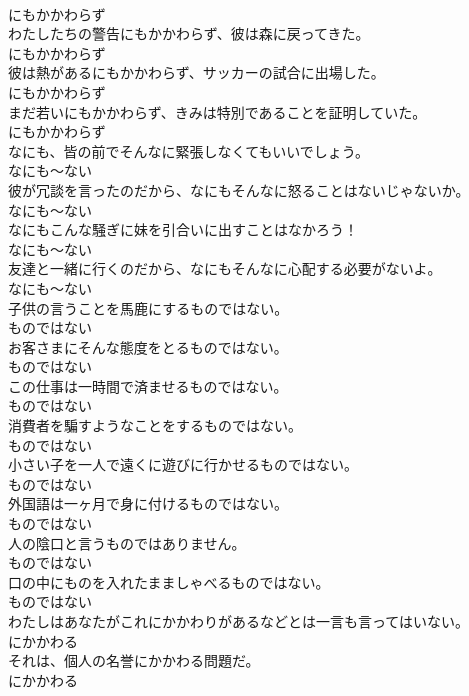\documentclass[8pt]{extreport}
\begin{document}
\begin{CJK}{UTF8}{min}
\\	にもかかわらず	
\\	わたしたちの警告にもかかわらず、彼は森に戻ってきた。	
\\	にもかかわらず	
\\	彼は熱があるにもかかわらず、サッカーの試合に出場した。	
\\	にもかかわらず	
\\	まだ若いにもかかわらず、きみは特別であることを証明していた。	
\\	にもかかわらず	
\\	なにも、皆の前でそんなに緊張しなくてもいいでしょう。	
\\	なにも～ない	
\\	彼が冗談を言ったのだから、なにもそんなに怒ることはないじゃないか。	
\\	なにも～ない	
\\	なにもこんな騒ぎに妹を引合いに出すことはなかろう！	
\\	なにも～ない	
\\	友達と一緒に行くのだから、なにもそんなに心配する必要がないよ。	
\\	なにも～ない	
\\	子供の言うことを馬鹿にするものではない。	
\\	ものではない	
\\	お客さまにそんな態度をとるものではない。	
\\	ものではない	
\\	この仕事は一時間で済ませるものではない。	
\\	ものではない	
\\	消費者を騙すようなことをするものではない。	
\\	ものではない	
\\	小さい子を一人で遠くに遊びに行かせるものではない。	
\\	ものではない	
\\	外国語は一ヶ月で身に付けるものではない。	
\\	ものではない	
\\	人の陰口と言うものではありません。	
\\	ものではない	
\\	口の中にものを入れたまましゃべるものではない。	
\\	ものではない	
\\	わたしはあなたがこれにかかわりがあるなどとは一言も言ってはいない。	
\\	にかかわる	
\\	それは、個人の名誉にかかわる問題だ。	
\\	にかかわる	

\end{CJK}
\end{document}
